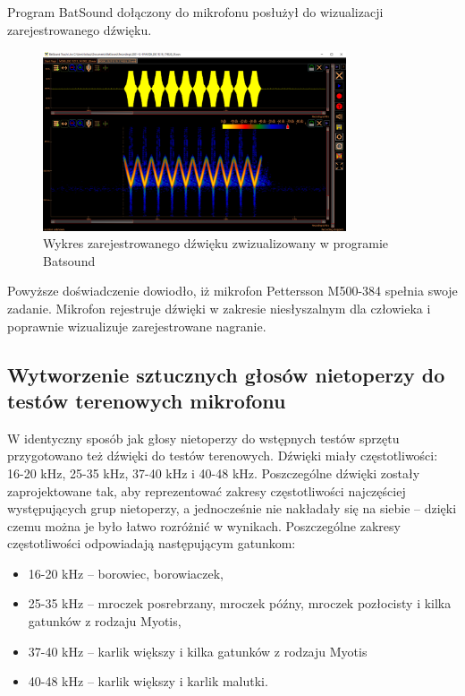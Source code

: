 \documentclass{sprz}
\begin{document}
Program BatSound dołączony do mikrofonu posłużył do wizualizacji zarejestrowanego dźwięku.

\begin{figure}[h]
    \centering
    \includegraphics[width=0.8\textwidth]{sprz/batsound}
    \caption{Wykres zarejestrowanego dźwięku zwizualizowany w programie Batsound}
    \label{img:batsound}
\end{figure}

Powyższe doświadczenie dowiodło, iż mikrofon Pettersson M500-384 spełnia swoje zadanie. Mikrofon rejestruje dźwięki w zakresie niesłyszalnym dla człowieka i poprawnie wizualizuje zarejestrowane nagranie.

\subsection{Wytworzenie sztucznych głosów nietoperzy do testów terenowych mikrofonu}
W identyczny sposób jak głosy nietoperzy do wstępnych testów sprzętu przygotowano też dźwięki do testów terenowych. Dźwięki miały częstotliwości: 16-20 kHz, 25-35 kHz, 37-40 kHz i 40-48 kHz. Poszczególne dźwięki zostały zaprojektowane tak, aby reprezentować zakresy częstotliwości najczęściej występujących grup nietoperzy, a jednocześnie nie nakładały się na siebie – dzięki czemu można je było łatwo rozróżnić w wynikach. Poszczególne zakresy częstotliwości odpowiadają następującym gatunkom:

\begin{itemize}
  \item{16-20 kHz – borowiec, borowiaczek,}
  \item{25-35 kHz – mroczek posrebrzany, mroczek późny, mroczek pozłocisty i kilka gatunków z rodzaju Myotis,}
  \item{37-40 kHz – karlik większy i kilka gatunków z rodzaju Myotis}
  \item{40-48 kHz – karlik większy i karlik malutki.}
\end{itemize}
\end{document}
